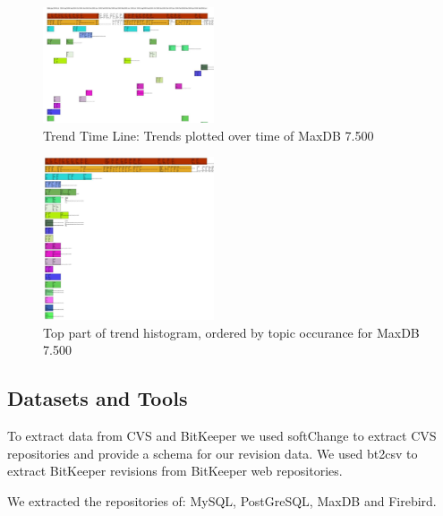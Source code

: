 \documentclass[times, 10pt,twocolumn]{article}
\begin{document}
\begin{figure}
  \centering
  \includegraphics[width=0.45\textwidth]{class-smear-plot-crop-scaled}
  \caption{Trend Time Line: Trends plotted over time of MaxDB 7.500}         
  \label{fig:trendtimeline}
\end{figure}


\begin{figure}
  \centering
  \includegraphics[width=0.45\textwidth]{histogram-cropped-scaled}
  \caption{Top part of trend histogram, ordered by topic occurance for MaxDB 7.500}       
  \label{fig:histogram}
\end{figure}


\subsection{Datasets and Tools}

To extract data from CVS and BitKeeper we used softChange to extract
CVS repositories and provide a schema for our revision data. We used
bt2csv to extract BitKeeper revisions from BitKeeper web repositories.

We extracted the repositories of: MySQL, PostGreSQL, MaxDB and
Firebird.

\end{document}
